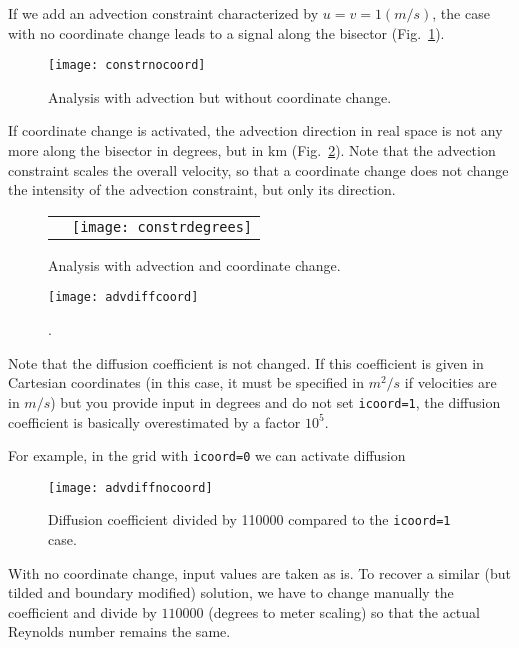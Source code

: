 If we add an advection constraint characterized by $u=v=1 (m/s)$, the case with no coordinate change leads to a signal along the bisector (Fig.~\ref{fig:constrnocoord}).


\begin{figure}[H]
\centering
\parbox{.6\textwidth}{
\texttt{[image: constrnocoord]}
}\parbox{.4\textwidth}{
\caption{Analysis with advection but without coordinate change.\label{fig:constrnocoord}}
}
\end{figure}


If coordinate change is activated, the advection direction in real space is not any more along the bisector in degrees, but in km (Fig.~\ref{fig:constrdegrees}). Note that the advection constraint scales the overall velocity, so that a coordinate change does not change the intensity of the advection constraint, but only its direction.


\begin{figure}[H]
\centering
\begin{tabular}{cc}
\raisebox{.2\textwidth}{\texttt{[image: constrdegrees]}}&\texttt{[image: constrdegrees]}
\end{tabular}
\caption{Analysis with advection and coordinate change.\label{fig:constrdegrees}}
\end{figure}




\begin{figure}[H]
\centering
\texttt{[image: advdiffcoord]}
\caption{.}
\end{figure}


Note that the diffusion coefficient is not changed. If this coefficient is given in 
Cartesian coordinates (in this case, it must be specified in $m^2/s$ if 
velocities are in $m/s$) but you provide input in degrees and do not set 
\texttt{icoord=1}, the diffusion coefficient is basically overestimated by a 
factor $10^5$.


For example, in the grid with \texttt{icoord=0} we can activate diffusion

\begin{figure}[H]
\centering
\texttt{[image: advdiffnocoord]}
\caption{Diffusion coefficient divided by 110000 compared to the 
\texttt{icoord=1} case.}
\end{figure}


With no coordinate change, input values are taken as is. To recover a similar (but tilded and boundary modified) solution, we have to change manually the coefficient and divide by $110000$ (degrees to meter scaling) so that the actual Reynolds number remains the same.

